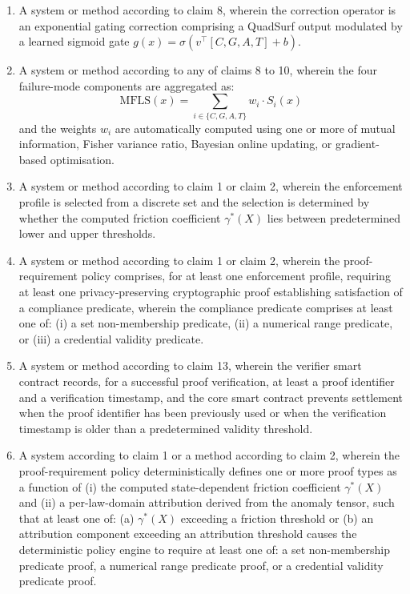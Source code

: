\documentclass[12pt,a4paper]{article}
\begin{document}
\begin{enumerate}[label=\textbf{\arabic*.}]
\item A system or method according to claim 8,
wherein the correction operator is an exponential gating correction
comprising a QuadSurf output modulated by a learned sigmoid gate
$g(x)=\sigma(v^\top[C,G,A,T]+b)$.

\item A system or method according to any of claims 8 to 10, wherein the
four failure-mode components are aggregated as:
\[
\mathrm{MFLS}(x)=\textstyle\sum_{i\in\{C,G,A,T\}} w_i\cdot S_i(x)
\]
and the weights $w_i$ are automatically computed using one or more of
mutual information, Fisher variance ratio, Bayesian online updating, or
gradient-based optimisation.

\item A system or method according to claim 1 or claim 2, wherein the
enforcement profile is selected from a discrete set and the selection
is determined by whether the computed friction coefficient $\gamma^*(X)$
lies between predetermined lower and upper thresholds.

\item A system or method according to claim 1 or claim 2, wherein the
proof-requirement policy comprises, for at least one enforcement profile,
requiring at least one privacy-preserving cryptographic proof establishing
satisfaction of a compliance predicate, wherein the compliance predicate
comprises at least one of: (i) a set non-membership predicate, (ii) a
numerical range predicate, or (iii) a credential validity predicate.

\item A system or method according to claim 13, wherein the
verifier smart contract records, for a successful proof verification, at
least a proof identifier and a verification timestamp, and the core smart
contract prevents settlement when the proof identifier has been previously
used or when the verification timestamp is older than a predetermined
validity threshold.

\item A system according to claim 1 or a method according to claim 2,
wherein the proof-requirement policy deterministically defines one or more
proof types as a function of (i) the computed state-dependent friction
coefficient $\gamma^*(X)$ and (ii) a per-law-domain attribution derived from
the anomaly tensor, such that at least one of: (a) $\gamma^*(X)$ exceeding a
friction threshold or (b) an attribution component exceeding an attribution
threshold causes the deterministic policy engine to require at least one of:
a set non-membership predicate proof, a numerical range predicate proof, or a
credential validity predicate proof.


\end{enumerate}
\end{document}
